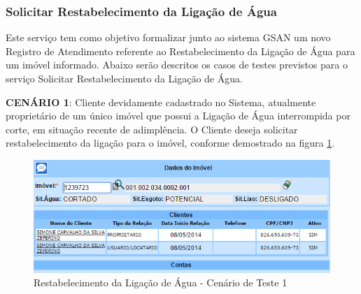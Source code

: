 \subsubsection{Solicitar Restabelecimento da Ligação de Água}
Este serviço tem como objetivo formalizar junto ao sistema GSAN um novo Registro de Atendimento referente ao Restabelecimento da Ligação de Água para um imóvel informado.
Abaixo serão descritos os casos de testes previstos para o serviço Solicitar Restabelecimento da Ligação de Água.
\begin{flushleft}
	\begin{description}
		\item \textbf{CENÁRIO 1}: Cliente devidamente cadastrado no Sistema, atualmente proprietário de um único imóvel que possui a Ligação de Água interrompida por corte, em situação recente de adimplência. O Cliente deseja solicitar restabelecimento da ligação para o imóvel, conforme demostrado na figura \ref{figura:restabelecimentoLigacaoCenario1}.
		\begin{figure}[H]
			\centering
			\caption{Restabelecimento da Ligação de Água - Cenário de Teste 1}
			\label{figura:restabelecimentoLigacaoCenario1}
			\includegraphics{figuras/cenarios/restabelecimento/cenario_1.PNG}
		\end{figure}
	\end{description}
	

\end{flushleft}
